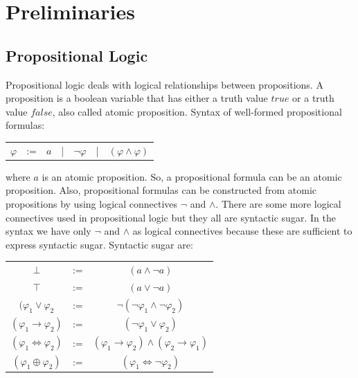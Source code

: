 \chapter{Preliminaries}
\label{chap:Preliminaries}
\section{Propositional Logic}
\label{sec:PropositionalLogic}
Propositional logic deals with logical relationships between propositions.
A proposition is a boolean variable that has either a truth value $\mathit{true}$ or a truth value $\mathit{false}$, also called atomic proposition.
Syntax of well-formed propositional formulas:\newline

\begin{table}[!ht]
\centering
\begin{tabular}{lllllll}
$\mathit{\varphi}$ & := & $\mathit{a}$ & | & $\neg \mathit{\varphi}$ & | & $( \mathit{\varphi} \wedge \mathit{\varphi} )$
\end{tabular}
\end{table}

\noindent where $\mathit{a}$ is an atomic proposition.
So, a propositional formula can be an atomic proposition.
Also, propositional formulas can be constructed from atomic propositions by using logical connectives $\neg$ and $\wedge$.
There are some more logical connectives used in propositional logic but they all are syntactic sugar.
In the syntax we have only $\neg$ and $\wedge$ as logical connectives because these are sufficient to express syntactic sugar.
Syntactic sugar are:\newline

\begin{table}[!ht]
\centering
\begin{tabular}{ccc}
$\bot$                   & := & $( \mathit{a} \wedge \neg \mathit{a} )$ \\
$\top$                   & := & $( \mathit{a} \vee \neg \mathit{a} )$  \\
$( \mathit{\varphi_{1}} \vee \mathit{\varphi_{2}}$      & := & $\neg ( \neg \mathit{\varphi_{1}} \wedge \neg \mathit{\varphi_{2}} )$     \\
$( \mathit{\varphi_{1}} \to \mathit{\varphi_{2}} )$ & := & $( \mathit{\neg \varphi_{1}} \vee \mathit{\varphi_{2}} )$     \\
$( \mathit{\varphi_{1}} \Leftrightarrow \mathit{\varphi_{2}} )$       & := & $( \mathit{\varphi_{1}} \to \mathit{\varphi_{2}} ) \wedge ( \mathit{\varphi_{2}} \to \mathit{\varphi_{1}} )$     \\
$( \mathit{\varphi_{1}} \oplus \mathit{\varphi_{2}} )$      & := & $( \varphi_{1} \Leftrightarrow \neg \varphi_{2} )$     
\end{tabular}
\end{table}

